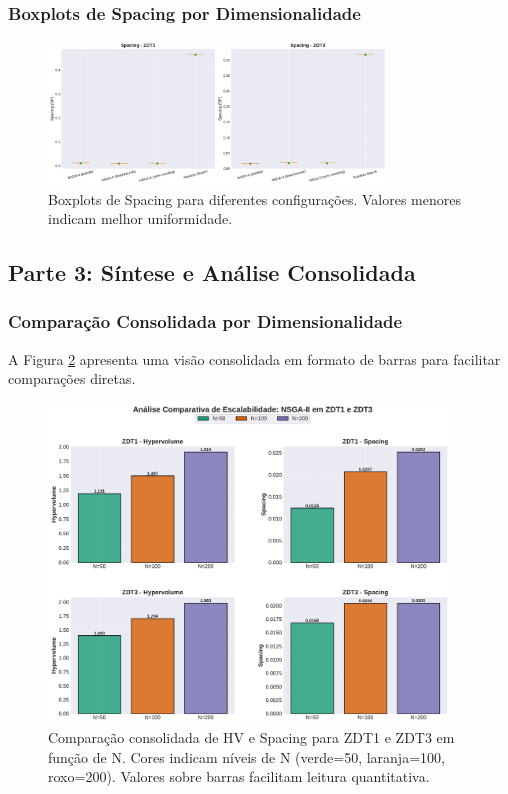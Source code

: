 \subsubsection{Boxplots de Spacing por Dimensionalidade}

\begin{figure}[h]
\centering
\includegraphics[width=0.80\textwidth]{../plots/D_spacing_boxplots.pdf}
\caption{Boxplots de Spacing para diferentes configurações. Valores menores indicam melhor uniformidade.}
\label{fig:sp_boxplots}
\end{figure}

\subsection{Parte 3: Síntese e Análise Consolidada}

\subsubsection{Comparação Consolidada por Dimensionalidade}
A Figura \ref{fig:combined} apresenta uma visão consolidada em formato de barras para facilitar comparações diretas.

\begin{figure}[h]
\centering
\includegraphics[width=0.95\textwidth]{../plots/K_combined_nvar_comparison.pdf}
\caption{Comparação consolidada de HV e Spacing para ZDT1 e ZDT3 em função de N. Cores indicam níveis de N (verde=50, laranja=100, roxo=200). Valores sobre barras facilitam leitura quantitativa.}
\label{fig:combined}
\end{figure}

